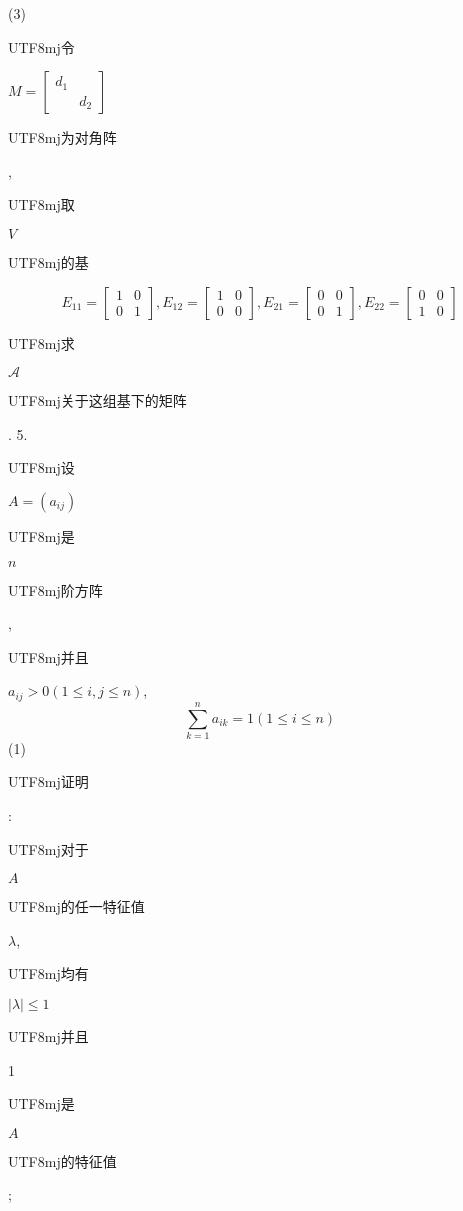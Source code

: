 \documentclass[10pt]{article}
\begin{document}
(3) \begin{CJK}{UTF8}{mj}令\end{CJK} $M=\left[\begin{array}{ll}d_{1} & \\ & d_{2}\end{array}\right]$ \begin{CJK}{UTF8}{mj}为对角阵\end{CJK}, \begin{CJK}{UTF8}{mj}取\end{CJK} $V$ \begin{CJK}{UTF8}{mj}的基\end{CJK}
$$
E_{11}=\left[\begin{array}{ll}
1 & 0 \\
0 & 1
\end{array}\right], E_{12}=\left[\begin{array}{ll}
1 & 0 \\
0 & 0
\end{array}\right], E_{21}=\left[\begin{array}{ll}
0 & 0 \\
0 & 1
\end{array}\right], E_{22}=\left[\begin{array}{ll}
0 & 0 \\
1 & 0
\end{array}\right]
$$
\begin{CJK}{UTF8}{mj}求\end{CJK} $\mathscr{A}$ \begin{CJK}{UTF8}{mj}关于这组基下的矩阵\end{CJK}. 5. \begin{CJK}{UTF8}{mj}设\end{CJK} $A=\left(a_{i j}\right)$ \begin{CJK}{UTF8}{mj}是\end{CJK} $n$ \begin{CJK}{UTF8}{mj}阶方阵\end{CJK}, \begin{CJK}{UTF8}{mj}并且\end{CJK} $a_{i j}>0(1 \leq i, j \leq n)$,
$$
\sum_{k=1}^{n} a_{i k}=1(1 \leq i \leq n)
$$
(1) \begin{CJK}{UTF8}{mj}证明\end{CJK}: \begin{CJK}{UTF8}{mj}对于\end{CJK} $A$ \begin{CJK}{UTF8}{mj}的任一特征值\end{CJK} $\lambda$, \begin{CJK}{UTF8}{mj}均有\end{CJK} $|\lambda| \leq 1$ \begin{CJK}{UTF8}{mj}并且\end{CJK} 1 \begin{CJK}{UTF8}{mj}是\end{CJK} $A$ \begin{CJK}{UTF8}{mj}的特征值\end{CJK};
\end{document}
